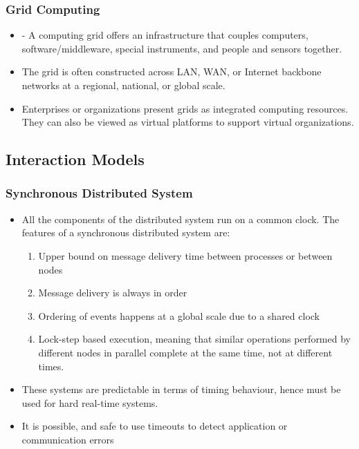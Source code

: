 \documentclass{article}
\begin{document}
\subsubsection{Grid Computing}
\begin{itemize}
    \item - A computing grid offers an infrastructure that couples computers, software/middleware, special instruments, and people and sensors together. 
    
    \item The grid is often constructed across LAN, WAN, or Internet backbone networks at a regional, national, or global scale. 
    
    \item Enterprises or organizations present grids as integrated computing resources. They can also be viewed as virtual platforms to support virtual organizations. 
\end{itemize}

\subsection{Interaction Models}
\subsubsection{Synchronous Distributed System}
\begin{itemize}
    \item All the components of the distributed system run on a common clock. The features of a synchronous distributed system are:
    \begin{enumerate}
        \item Upper bound on message delivery time between processes or between nodes
        
        \item Message delivery is always in order
        
        \item Ordering of events happens at a global scale due to a shared clock
        
        \item Lock-step based execution, meaning that similar operations performed by different nodes in parallel complete at the same time, not at different times.
    \end{enumerate}
    
    \item These systems are predictable in terms of timing behaviour, hence must be used for hard real-time systems. 
    
    \item It is possible, and safe to use timeouts to detect application or communication errors
\end{itemize}
\end{document}
